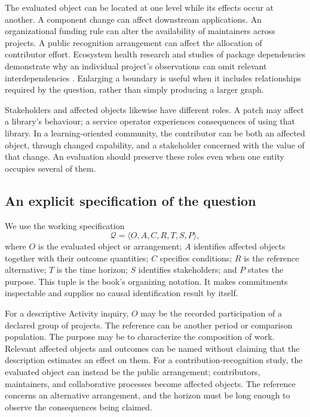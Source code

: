 The evaluated object can be located at one level while its effects occur at another. A component change can affect downstream applications. An organizational funding rule can alter the availability of maintainers across projects. A public recognition arrangement can affect the allocation of contributor effort. Ecosystem health research and studies of package dependencies demonstrate why an individual project's observations can omit relevant interdependencies \citep{jansen2014,decan2019}. Enlarging a boundary is useful when it includes relationships required by the question, rather than simply producing a larger graph.

Stakeholders and affected objects likewise have different roles. A patch may affect a library's behaviour; a service operator experiences consequences of using that library. In a learning-oriented community, the contributor can be both an affected object, through changed capability, and a stakeholder concerned with the value of that change. An evaluation should preserve these roles even when one entity occupies several of them.

\subsection{An explicit specification of the question}
We use the working specification
\begin{equation}
\mathcal Q=\langle O,A,C,R,T,S,P\rangle ,
\label{eq:question}
\end{equation}
where \(O\) is the evaluated object or arrangement; \(A\) identifies affected objects together with their outcome quantities; \(C\) specifies conditions; \(R\) is the reference alternative; \(T\) is the time horizon; \(S\) identifies stakeholders; and \(P\) states the purpose. This tuple is the book's organizing notation. It makes commitments inspectable and supplies no causal identification result by itself.

For a descriptive Activity inquiry, \(O\) may be the recorded participation of a declared group of projects. The reference can be another period or comparison population. The purpose may be to characterize the composition of work. Relevant affected objects and outcomes can be named without claiming that the description estimates an effect on them. For a contribution-recognition study, the evaluated object can instead be the public arrangement; contributors, maintainers, and collaborative processes become affected objects. The reference concerns an alternative arrangement, and the horizon must be long enough to observe the consequences being claimed.

